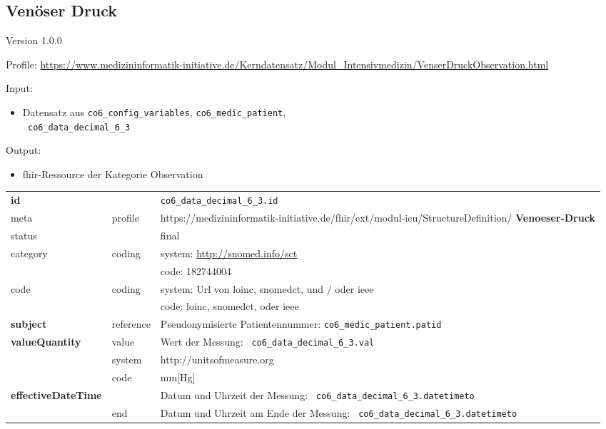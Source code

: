 \subsection{Venöser Druck} 
\noindent Version 1.0.0

\noindent Profile: \url{https://www.medizininformatik-initiative.de/Kerndatensatz/Modul_Intensivmedizin/VenserDruckObservation.html}

\noindent Input:
\begin{itemize}
	\item Datensatz aus \texttt{co6\_config\_variables}, \texttt{co6\_medic\_patient}, \\ \texttt{
co6\_data\_decimal\_6\_3}
\end{itemize}
Output:
\begin{itemize}
        \item \ac{fhir}-Ressource der Kategorie \glqq Observation\grqq{}
\end{itemize}
\begin{longtable}{|l|l|p{7.5cm}|}
        \hline
        \rowcolor{lightgray} \multicolumn{3}{|l|}{Data Mapping (inhaltlich)} \\ \hline
        \textbf{id} &  & \texttt{co6\_data\_decimal\_6\_3.id} \\ \hline
	meta & profile & https://medizininformatik-initiative.de/fhir/ext/modul-icu/StructureDefinition/\textbf{
Venoeser-Druck} \\ \hline 
	status &  & final   \\ \hline 
	category & coding & system: \url{http://snomed.info/sct} \\
\cline{3-3}
	& & code: 182744004 \\ \hline
	code & coding & system: Url von \ac{loinc}, \ac{snomedct}, und / oder \ac{ieee} \\ 
	\cline{3-3} 
	 &  & code: \ac{loinc}, \ac{snomedct}, oder \ac{ieee} \\ \hline
	 \textbf{subject}  & reference & Pseudonymisierte Patientennummer: \texttt{co6\_medic\_patient.patid} \\ \hline
	 \textbf{valueQuantity}  & value & Wert der Messung: \texttt{
co6\_data\_decimal\_6\_3.val} \\
        \cline{2-3}
         & system & http://unitsofmeasure.org \\
         \cline{2-3}
         & code & mm[Hg] \\ \hline
     \textbf{effectiveDateTime}  & & Datum und Uhrzeit der Messung: \texttt{
co6\_data\_decimal\_6\_3.datetimeto} \\
    \cline{2-3}
     & end & Datum und Uhrzeit am Ende der Messung: \texttt{
co6\_data\_decimal\_6\_3.datetimeto} \\ \hline
\end{longtable}


